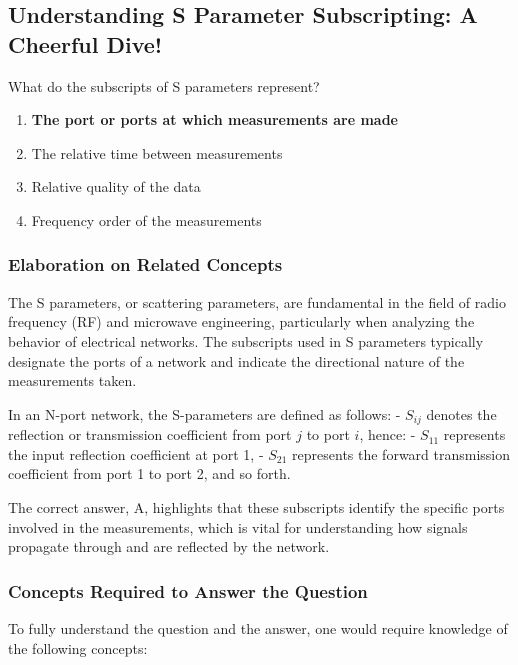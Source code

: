 \subsection{Understanding S Parameter Subscripting: A Cheerful Dive!}

\begin{tcolorbox}[colback=gray!10, colframe=black, title=E4B07]
What do the subscripts of S parameters represent?
\begin{enumerate}[label=\Alph*.]
    \item \textbf{The port or ports at which measurements are made}
    \item The relative time between measurements
    \item Relative quality of the data
    \item Frequency order of the measurements
\end{enumerate} \end{tcolorbox}

\subsubsection{Elaboration on Related Concepts}

The S parameters, or scattering parameters, are fundamental in the field of radio frequency (RF) and microwave engineering, particularly when analyzing the behavior of electrical networks. The subscripts used in S parameters typically designate the ports of a network and indicate the directional nature of the measurements taken.

In an N-port network, the S-parameters are defined as follows:
- \( S_{ij} \) denotes the reflection or transmission coefficient from port \( j \) to port \( i \), hence:
  - \( S_{11} \) represents the input reflection coefficient at port 1,
  - \( S_{21} \) represents the forward transmission coefficient from port 1 to port 2, and so forth.

The correct answer, A, highlights that these subscripts identify the specific ports involved in the measurements, which is vital for understanding how signals propagate through and are reflected by the network.

\subsubsection{Concepts Required to Answer the Question}
To fully understand the question and the answer, one would require knowledge of the following concepts:

